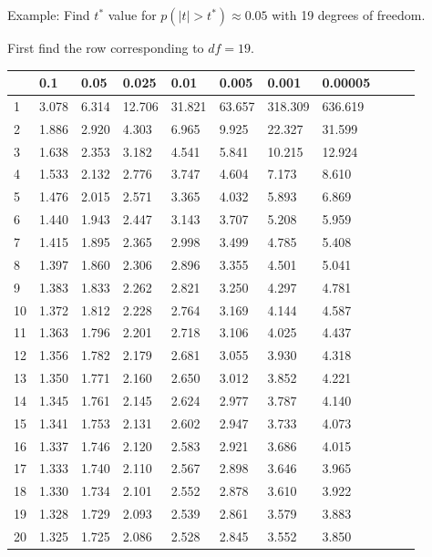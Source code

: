 \begin{frame}{\small Example: Find $t^*$ value for $p(|t|>t^*)
\approx 0.05$ with 19 degrees of freedom.}
  
{\small First find the row corresponding to $df=19$.}

  {
\fontsize{5pt}{5pt}
\selectfont

\begin{tabular}{l|llllllllll}
 & 0.1&0.05&0.025&0.01&0.005&0.001&0.00005\\ \hline
 1 & 3.078 & 6.314 & 12.706 & 31.821 & 63.657 & 318.309 & 636.619 \\ 
 2 & 1.886 & 2.920 & 4.303 & 6.965 & 9.925 & 22.327 & 31.599 \\ 
 3 & 1.638 & 2.353 & 3.182 & 4.541 & 5.841 & 10.215 & 12.924 \\ 
 4 & 1.533 & 2.132 & 2.776 & 3.747 & 4.604 & 7.173 & 8.610 \\ 
 5 & 1.476 & 2.015 & 2.571 & 3.365 & 4.032 & 5.893 & 6.869 \\ 
[5pt]
 6 & 1.440 & 1.943 & 2.447 & 3.143 & 3.707 & 5.208 & 5.959 \\ 
 7 & 1.415 & 1.895 & 2.365 & 2.998 & 3.499 & 4.785 & 5.408 \\ 
 8 & 1.397 & 1.860 & 2.306 & 2.896 & 3.355 & 4.501 & 5.041 \\ 
 9 & 1.383 & 1.833 & 2.262 & 2.821 & 3.250 & 4.297 & 4.781 \\ 
10 & 1.372 & 1.812 & 2.228 & 2.764 & 3.169 & 4.144 & 4.587 \\ 
[5pt]
11 & 1.363 & 1.796 & 2.201 & 2.718 & 3.106 & 4.025 & 4.437 \\ 
12 & 1.356 & 1.782 & 2.179 & 2.681 & 3.055 & 3.930 & 4.318 \\ 
13 & 1.350 & 1.771 & 2.160 & 2.650 & 3.012 & 3.852 & 4.221 \\ 
14 & 1.345 & 1.761 & 2.145 & 2.624 & 2.977 & 3.787 & 4.140 \\ 
15 & 1.341 & 1.753 & 2.131 & 2.602 & 2.947 & 3.733 & 4.073 \\ 
[5pt]
16 & 1.337 & 1.746 & 2.120 & 2.583 & 2.921 & 3.686 & 4.015 \\ 
17 & 1.333 & 1.740 & 2.110 & 2.567 & 2.898 & 3.646 & 3.965 \\ 
18 & 1.330 & 1.734 & 2.101 & 2.552 & 2.878 & 3.610 & 3.922 \\ 
\rowcolor{red}19 & 1.328 & 1.729 & 2.093 & 2.539 & 2.861 & 3.579 & 3.883 \\ 
20 & 1.325 & 1.725 & 2.086 & 2.528 & 2.845 & 3.552 & 3.850 \\ 

\end{tabular}}
\end{frame}
